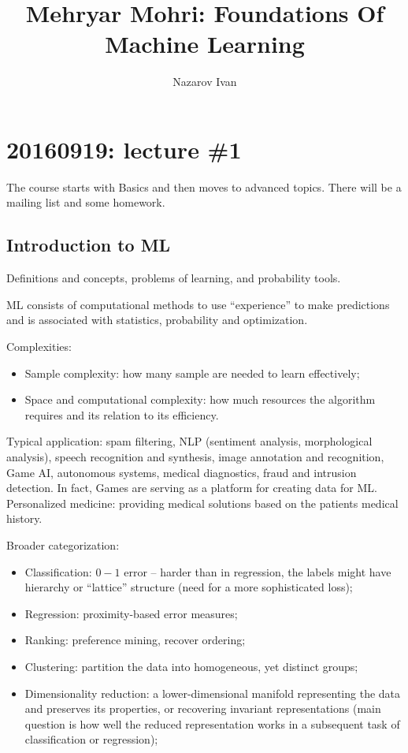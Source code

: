 \documentclass[a4paper]{article}
\title{Mehryar Mohri: Foundations Of Machine Learning}
\author{Nazarov Ivan}
\begin{document}
\section{20160919: lecture \#1} %
\label{sec:20160919_lecture_1}

The course starts with Basics and then moves to advanced topics. There will be
a mailing list and some homework.

\subsection{Introduction to ML} %
\label{sub:introduction_to_ml}
Definitions and concepts, problems of learning, and probability tools.

ML consists of computational methods to use ``experience'' to make predictions and
is associated with statistics, probability and optimization.

Complexities: \begin{itemize}
    \item Sample complexity: how many sample are needed to learn effectively;
    \item Space and computational complexity: how much resources the algorithm
    requires and its relation to its efficiency.
\end{itemize}

Typical application: spam filtering, NLP (sentiment analysis, morphological analysis),
speech recognition and synthesis, image annotation and recognition, Game AI, autonomous
systems, medical diagnostics, fraud and intrusion detection.
\noindent In fact, Games are serving as a platform for creating data for ML.
\noindent Personalized medicine: providing medical solutions based on the patients
medical history.

Broader categorization: \begin{itemize}
    \item Classification: $0-1$ error -- harder than in regression, the labels might
    have hierarchy or ``lattice'' structure (need for a more sophisticated loss);
    \item Regression: proximity-based error measures;
    \item Ranking: preference mining, recover ordering;
    \item Clustering: partition the data into homogeneous, yet distinct groups;
    \item Dimensionality reduction: a lower-dimensional manifold representing the
    data and preserves its properties, or recovering invariant representations (main
    question is how well the reduced representation works in a subsequent task of
    classification or regression);
\end{itemize}
\end{document}
